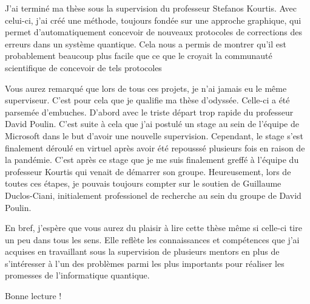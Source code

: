 J'ai terminé ma thèse sous la supervision du professeur Stefanos Kourtis.
Avec celui-ci,
j'ai créé une méthode, toujours fondée sur une approche graphique, 
qui permet d'automatiquement concevoir de nouveaux protocoles de 
corrections des erreurs dans un système quantique.
Cela nous a permis de montrer qu'il est probablement beaucoup plus facile 
que ce que le croyait la communauté scientifique de concevoir de tels protocoles

Vous aurez remarqué que lors de tous ces projets,
je n'ai jamais eu le même superviseur.
C'est pour cela que je qualifie ma thèse d'odyssée.
Celle-ci a été parsemée d'embuches.
D'abord avec le triste départ trop rapide du professeur David Poulin.
C'est suite à cela que j'ai postulé un stage au sein de l'équipe de Microsoft
dans le but d'avoir une nouvelle supervision.
Cependant, le stage s'est finalement déroulé en virtuel après avoir été repousssé
plusieurs fois en raison de la pandémie.
C'est après ce stage que je me suis finalement greffé à l'équipe du professeur Kourtis 
qui venait de démarrer son groupe.
Heureusement,
lors de toutes ces étapes, 
je pouvais toujours compter sur le soutien de Guillaume Duclos-Ciani,
initialement professionel de recherche au sein du groupe de David Poulin.

En bref,
j'espère que vous aurez du plaisir à lire cette thèse même si celle-ci 
tire un peu dans tous les sens.
Elle reflète les connaissances et compétences que j'ai acquises en travaillant sous 
la supervision de plusieurs mentors en plus de s'intéresser à l'un des problèmes
parmi les plus importants pour réaliser les promesses de l'informatique quantique.

Bonne lecture !
